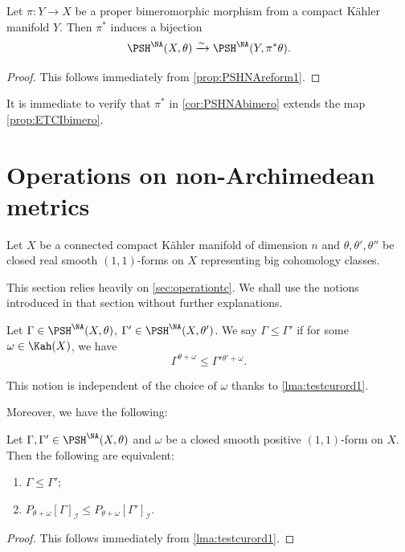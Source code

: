 \begin{corollary}\label{cor:PSHNAbimero}
    Let $\pi\colon Y\rightarrow X$ be a proper bimeromorphic morphism from a compact K\"ahler manifold $Y$. Then $\pi^*$ induces a bijection
    \[
    \PSH^{\NA}(X,\theta)\xrightarrow{\sim} \PSH^{\NA}(Y,\pi^*\theta).
    \]
\end{corollary}
\begin{proof}
    This follows immediately from \cref{prop:PSHNAreform1}.
\end{proof}
It is immediate to verify that $\pi^*$ in \cref{cor:PSHNAbimero} extends the map \cref{prop:ETCIbimero}.

\section{Operations on non-Archimedean metrics}\label{sec:opnA}
Let $X$ be a connected compact K\"ahler manifold of dimension $n$ and $\theta,\theta',\theta''$ be closed real smooth $(1,1)$-forms on $X$ representing big cohomology classes.

This section relies heavily on \cref{sec:operationtc}. We shall use the notions introduced in that section without further explanations.

\begin{definition}\label{def:NApotential:L274}
    Let $\Gamma\in \PSH^{\NA}(X,\theta)$, $\Gamma'\in \PSH^{\NA}(X,\theta')$. We say $\Gamma\leq \Gamma'$ if for some $\omega\in \Kah(X)$, we have
    \[
        \Gamma^{\theta+\omega} \leq \Gamma'{}^{\theta'+\omega}.
    \]
\end{definition}
This notion is independent of the choice of $\omega$ thanks to \cref{lma:testcurord1}.

Moreover, we have the following:
\begin{proposition}\label{prop:NApotential:L284}
    Let $\Gamma,\Gamma'\in \PSH^{\NA}(X,\theta)$ and $\omega$ be a closed smooth positive $(1,1)$-form on $X$. Then the following are equivalent:
    \begin{enumerate}
        \item\label{itm:chapter-NApotential:L296:1} $\Gamma\leq \Gamma'$;
        \item\label{itm:chapter-NApotential:L296:2} $P_{\theta+\omega}[\Gamma]_{\mathcal{I}}\leq P_{\theta+\omega}[\Gamma']_{\mathcal{I}}$.
    \end{enumerate}
\end{proposition}
\begin{proof}
    This follows immediately from \cref{lma:testcurord1}.
\end{proof}


